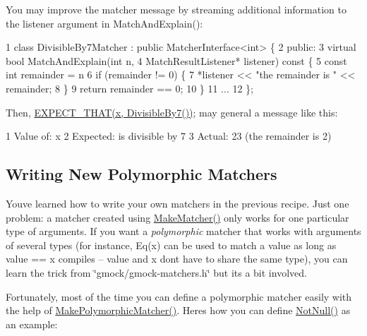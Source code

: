 You may improve the matcher message by streaming additional information to the {\ttfamily listener} argument in {\ttfamily Match\+And\+Explain()}\+:


\begin{DoxyCode}
1 class DivisibleBy7Matcher : public MatcherInterface<int> \{
2  public:
3   virtual bool MatchAndExplain(int n,
4                                MatchResultListener* listener) const \{
5     const int remainder = n %
6     if (remainder != 0) \{
7       *listener << "the remainder is " << remainder;
8     \}
9     return remainder == 0;
10   \}
11   ...
12 \};
\end{DoxyCode}


Then, {\ttfamily \hyperlink{gmock-matchers_8h_ac31e206123aa702e1152bb2735b31409}{E\+X\+P\+E\+C\+T\+\_\+\+T\+H\+A\+T(x, Divisible\+By7())};} may general a message like this\+: 
\begin{DoxyCode}
1 Value of: x
2 Expected: is divisible by 7
3   Actual: 23 (the remainder is 2)
\end{DoxyCode}


\subsection*{Writing New Polymorphic Matchers}

You\textquotesingle{}ve learned how to write your own matchers in the previous recipe. Just one problem\+: a matcher created using {\ttfamily \hyperlink{namespacetesting_a37fd8029ac00e60952440a3d9cca8166}{Make\+Matcher()}} only works for one particular type of arguments. If you want a {\itshape polymorphic} matcher that works with arguments of several types (for instance, {\ttfamily Eq(x)} can be used to match a {\ttfamily value} as long as {\ttfamily value} == {\ttfamily x} compiles -- {\ttfamily value} and {\ttfamily x} don\textquotesingle{}t have to share the same type), you can learn the trick from {\ttfamily \char`\"{}gmock/gmock-\/matchers.\+h\char`\"{}} but it\textquotesingle{}s a bit involved.

Fortunately, most of the time you can define a polymorphic matcher easily with the help of {\ttfamily \hyperlink{namespacetesting_a667ca94f190ec2e17ee2fbfdb7d3da04}{Make\+Polymorphic\+Matcher()}}. Here\textquotesingle{}s how you can define {\ttfamily \hyperlink{namespacetesting_a39d1f92b53b8b2a0b6db6a22ac146416}{Not\+Null()}} as an example\+:


